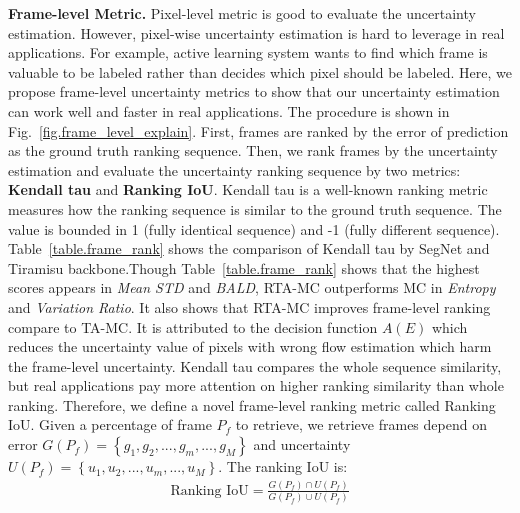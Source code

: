 \noindent\textbf{Frame-level Metric.} Pixel-level metric is good to evaluate the uncertainty estimation. However, pixel-wise uncertainty estimation is hard to leverage in real applications. For example, active learning system wants to find which frame is valuable to be labeled rather than decides which pixel should be labeled. Here, we propose frame-level uncertainty metrics to show that our uncertainty estimation can work well and faster in real applications. The procedure is shown in Fig.~\ref{fig.frame_level_explain}. First, frames are ranked by the error of prediction as the ground truth ranking sequence. Then, we rank frames by the uncertainty estimation and evaluate the uncertainty ranking sequence by two metrics: \textbf{Kendall tau} \cite{kendall1938new} and \textbf{Ranking IoU}. Kendall tau is a well-known ranking metric measures how the ranking sequence is similar to the ground truth sequence. The value is bounded in 1 (fully identical sequence) and -1 (fully different sequence). Table~\ref{table.frame_rank} shows the comparison of Kendall tau by SegNet and Tiramisu backbone.Though Table~\ref{table.frame_rank} shows that the highest scores appears in \textit{Mean STD} and \textit{BALD}, RTA-MC outperforms MC in \textit{Entropy} and \textit{Variation Ratio}. It also shows that RTA-MC improves frame-level ranking compare to TA-MC. It is attributed to the decision function $A(E)$ which reduces the uncertainty value of pixels with wrong flow estimation which harm the frame-level uncertainty. Kendall tau compares the whole sequence similarity, but real applications pay more attention on higher ranking similarity than whole ranking. Therefore, we define a novel frame-level ranking metric called Ranking IoU. Given a percentage of frame $P_{f}$ to retrieve, we retrieve frames depend on error $G\left(P_{f}\right) = \left \{ g_{1}, g_{2}, ..., g_m, ..., g_{M} \right \}$ and uncertainty $U\left(P_{f}\right) = \left \{ u_{1}, u_{2}, ..., u_m, ..., u_{M} \right \}$. The ranking IoU is:
\begin{align}
\text{Ranking IoU} = \frac{G\left ( P_{f}  \right )\cap U\left ( P_{f}  \right )}{G\left ( P_{f}  \right )\cup  U\left ( P_{f}  \right )}
\end{align} 
